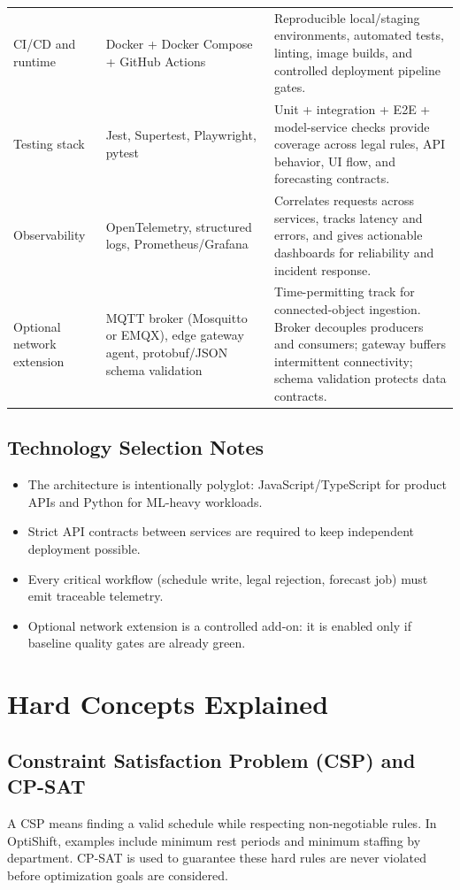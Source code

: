 \documentclass[11pt,a4paper]{article}
\begin{document}
\begin{longtable}{P{0.18\textwidth}P{0.24\textwidth}P{0.46\textwidth}}
CI/CD and runtime & Docker + Docker Compose + GitHub Actions & Reproducible local/staging environments, automated tests, linting, image builds, and controlled deployment pipeline gates. \\
Testing stack & Jest, Supertest, Playwright, pytest & Unit + integration + E2E + model-service checks provide coverage across legal rules, API behavior, UI flow, and forecasting contracts. \\
Observability & OpenTelemetry, structured logs, Prometheus/Grafana & Correlates requests across services, tracks latency and errors, and gives actionable dashboards for reliability and incident response. \\
Optional network extension & MQTT broker (Mosquitto or EMQX), edge gateway agent, protobuf/JSON schema validation & Time-permitting track for connected-object ingestion. Broker decouples producers and consumers; gateway buffers intermittent connectivity; schema validation protects data contracts. \\
\bottomrule
\end{longtable}

\subsection{Technology Selection Notes}
\begin{itemize}
  \item The architecture is intentionally polyglot: JavaScript/TypeScript for product APIs and Python for ML-heavy workloads.
  \item Strict API contracts between services are required to keep independent deployment possible.
  \item Every critical workflow (schedule write, legal rejection, forecast job) must emit traceable telemetry.
  \item Optional network extension is a controlled add-on: it is enabled only if baseline quality gates are already green.
\end{itemize}

\section{Hard Concepts Explained}
\subsection{Constraint Satisfaction Problem (CSP) and CP-SAT}
A CSP means finding a valid schedule while respecting non-negotiable rules.
In OptiShift, examples include minimum rest periods and minimum staffing by department.
CP-SAT is used to guarantee these hard rules are never violated before optimization goals are considered.
\end{document}
